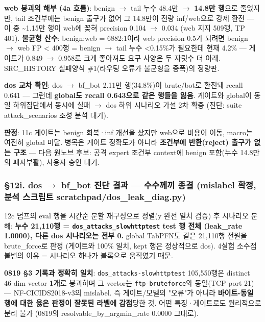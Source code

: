 \textbf{web 붕괴의 해부 (4a 흐름)}: benign \ensuremath{\rightarrow} tail 누수 48.4만 \ensuremath{\rightarrow} \textbf{14.8만 행}으로 줄었지만, tail 조건부에는 benign 출구가 없어 그 14.8만이 전량 inf/\allowbreak{}web으로 강제 환전 — 이 중 \textasciitilde{}1.15만 행이 web에 꽂혀 precision 0.104 \ensuremath{\rightarrow} 0.034 (web 지지 509행, TP 401). \textbf{불균형 산수}: benign:web =\allowbreak{} 6882:1이라 web precision 0.5가 되려면 benign \ensuremath{\rightarrow} web FP < 400행 =\allowbreak{} benign \ensuremath{\rightarrow} tail 누수 <0.15\%가 필요한데 현재 4.2\% — 게이트가 0.849 \ensuremath{\rightarrow} 0.958로 크게 좋아져도 요구 사양은 두 자릿수 더 아래. SRC\_\allowbreak{}HISTORY 실패양식 \#1(라우팅 오류가 불균형을 증폭)의 정량판.

\textbf{dos 교차 확인}: dos \ensuremath{\rightarrow} bf\_\allowbreak{}bot 2.11만 행(34.8\%)이 brute/\allowbreak{}bot로 환전돼 recall 0.641 — 그런데 \textbf{global도 recall 0.643으로 같은 행들을 잃음}. 게이트와 global이 동일 하위집단에서 동시에 실패  \ensuremath{\rightarrow}  dos 하위 시나리오 가설 2차 확증 (진단: suite attack\_\allowbreak{}scenarios 조성 분석 대기).

\textbf{판정}: 11c 게이트는 benign 회복·inf 개선을 샀지만 web으로 비용이 이동, macro는 여전히 global 미달. 병목은 게이트 정확도가 아니라 \textbf{조건부에 반환(reject) 출구가 없는 구조} — 다음 원노브 후보: 공격 expert 조건부 context에 benign 포함(누수 14.8만의 패자부활), 사용자 승인 대기.

\subsubsection{§12i. dos \ensuremath{\rightarrow} bf\_\allowbreak{}bot 진단 결과 — 수수께끼 종결 (mislabel 확정, 분석 스크립트 scratchpad/\allowbreak{}dos\_\allowbreak{}leak\_\allowbreak{}diag.py)}
12c 덤프의 eval 행을 시간순 분할 재구성으로 정렬(y 완전 일치 검증) 후 시나리오 분해: \textbf{누수 21,110행 =\allowbreak{} \texttt{dos\_\allowbreak{}\allowbreak{}atta\allowbreak{}cks\_\allowbreak{}\allowbreak{}slow\allowbreak{}httptest\allowbreak{}} test 행 전체 (leak\_\allowbreak{}rate 1.0000), 다른 dos 시나리오는 전부 0.} global TabPFN도 같은 21,110행 전원을 brute\_\allowbreak{}force로 판정 (게이트와 100\% 일치, kept 행은 정상적으로 dos). 4실험 소수점 불변의 이유 =\allowbreak{} 시나리오 하나가 블록으로 움직였기 때문.

\textbf{0819 §3 기록과 정확히 일치}: \texttt{dos\_\allowbreak{}\allowbreak{}atta\allowbreak{}cks-\allowbreak{}slow\allowbreak{}httptest\allowbreak{}} 105,550행은 distinct 46-dim vector \textbf{1개}로 붕괴하며 그 vector는 \texttt{ftp-\allowbreak{}brut\allowbreak{}eforce}와 동일(TCP port 21) — NF-CICIDS2018-v3의 mislabel. 즉 게이트/\allowbreak{}모델의 "오류"가 아니라 \textbf{바이트-동일 행에 대한 옳은 판정이 잘못된 라벨에 감점}당한 것. 어떤 특징·게이트로도 원리적으로 분리 불가 (0819의 resolvable\_\allowbreak{}by\_\allowbreak{}argmin\_\allowbreak{}rate 0.0000 그대로).

